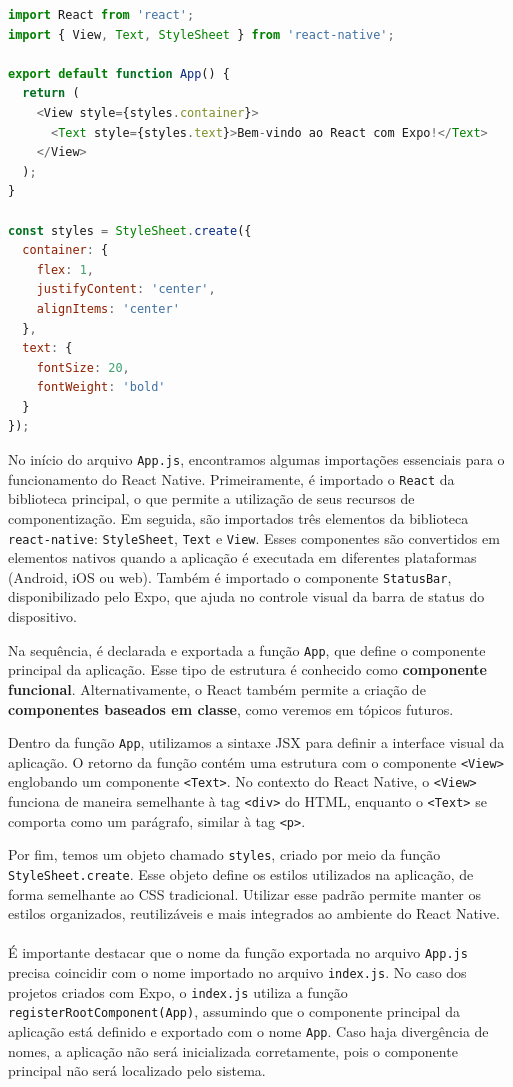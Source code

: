 \begin{lstlisting}[language=JavaScript, caption={Novo conteúdo de App.js}]
import React from 'react';
import { View, Text, StyleSheet } from 'react-native';

export default function App() {
  return (
    <View style={styles.container}>
      <Text style={styles.text}>Bem-vindo ao React com Expo!</Text>
    </View>
  );
}

const styles = StyleSheet.create({
  container: {
    flex: 1,
    justifyContent: 'center',
    alignItems: 'center'
  },
  text: {
    fontSize: 20,
    fontWeight: 'bold'
  }
});
\end{lstlisting}

No início do arquivo \texttt{App.js}, encontramos algumas importações essenciais para o funcionamento do React Native. Primeiramente, é importado o \texttt{React} da biblioteca principal, o que permite a utilização de seus recursos de componentização. Em seguida, são importados três elementos da biblioteca \texttt{react-native}: \texttt{StyleSheet}, \texttt{Text} e \texttt{View}. Esses componentes são convertidos em elementos nativos quando a aplicação é executada em diferentes plataformas (Android, iOS ou web). Também é importado o componente \texttt{StatusBar}, disponibilizado pelo Expo, que ajuda no controle visual da barra de status do dispositivo.

Na sequência, é declarada e exportada a função \texttt{App}, que define o componente principal da aplicação. Esse tipo de estrutura é conhecido como \textbf{componente funcional}. Alternativamente, o React também permite a criação de \textbf{componentes baseados em classe}, como veremos em tópicos futuros.

Dentro da função \texttt{App}, utilizamos a sintaxe JSX para definir a interface visual da aplicação. O retorno da função contém uma estrutura com o componente \texttt{<View>} englobando um componente \texttt{<Text>}. No contexto do React Native, o \texttt{<View>} funciona de maneira semelhante à tag \texttt{<div>} do HTML, enquanto o \texttt{<Text>} se comporta como um parágrafo, similar à tag \texttt{<p>}.

Por fim, temos um objeto chamado \texttt{styles}, criado por meio da função \texttt{StyleSheet.create}. Esse objeto define os estilos utilizados na aplicação, de forma semelhante ao CSS tradicional. Utilizar esse padrão permite manter os estilos organizados, reutilizáveis e mais integrados ao ambiente do React Native.

\paragraph{}
É importante destacar que o nome da função exportada no arquivo \texttt{App.js} precisa coincidir com o nome importado no arquivo \texttt{index.js}. No caso dos projetos criados com Expo, o \texttt{index.js} utiliza a função \texttt{registerRootComponent(App)}, assumindo que o componente principal da aplicação está definido e exportado com o nome \texttt{App}. Caso haja divergência de nomes, a aplicação não será inicializada corretamente, pois o componente principal não será localizado pelo sistema.




